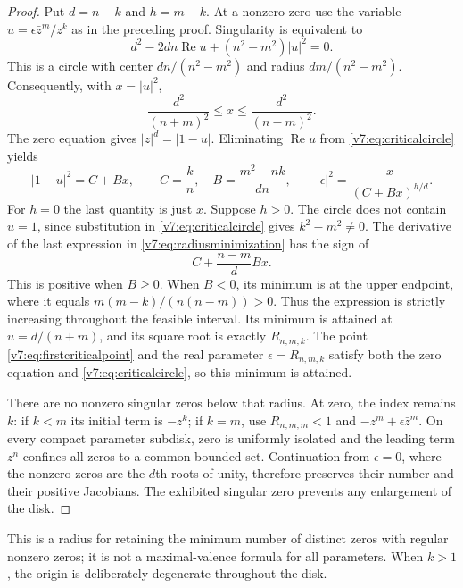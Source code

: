 \documentclass[UTF8,11pt]{ctexart}
\theoremstyle{definition}
\numberwithin{equation}{section}
\DeclareMathOperator{\Rea}{Re}\DeclareMathOperator{\Ima}{Im}
\begin{document}
\begin{proof}
Put $d=n-k$ and $h=m-k$. At a nonzero zero use the variable
$u=\epsilon\bar z^m/z^k$ as in the preceding proof. Singularity
is equivalent to
\begin{equation}\label{v7:eq:criticalcircle}
 d^2-2dn\Rea u+(n^2-m^2)|u|^2=0.
\end{equation}
This is a circle with center $dn/(n^2-m^2)$ and radius
$dm/(n^2-m^2)$. Consequently, with $x=|u|^2$,
\[
 \frac{d^2}{(n+m)^2}\le x\le\frac{d^2}{(n-m)^2}.
\]
The zero equation gives $|z|^d=|1-u|$. Eliminating $\Rea u$
from \eqref{v7:eq:criticalcircle} yields
\begin{equation}\label{v7:eq:radiusminimization}
 |1-u|^2=C+Bx,\qquad
 C=\frac{k}{n},\quad B=\frac{m^2-nk}{dn},\qquad
 |\epsilon|^2=\frac{x}{(C+Bx)^{h/d}}.
\end{equation}
For $h=0$ the last quantity is just $x$. Suppose $h>0$.
The circle does not contain $u=1$, since substitution in
\eqref{v7:eq:criticalcircle} gives $k^2-m^2\ne0$.
The derivative of the last expression in
\eqref{v7:eq:radiusminimization} has the sign of
\[
 C+\frac{n-m}{d}Bx.
\]
This is positive when $B\ge0$. When $B<0$, its minimum is at
the upper endpoint, where it equals
$m(m-k)/(n(n-m))>0$. Thus the expression is strictly increasing
throughout the feasible interval. Its minimum is attained at
$u=d/(n+m)$, and its square root is exactly $R_{n,m,k}$.
The point \eqref{v7:eq:firstcriticalpoint} and the real parameter
$\epsilon=R_{n,m,k}$ satisfy both the zero equation and
\eqref{v7:eq:criticalcircle}, so this minimum is attained.

There are no nonzero singular zeros below that radius. At zero,
the index remains $k$: if $k<m$ its initial term is $-z^k$;
if $k=m$, use $R_{n,m,m}<1$ and
$-z^m+\epsilon\bar z^m$. On every compact parameter subdisk,
zero is uniformly isolated and the leading term $z^n$ confines
all zeros to a common bounded set. Continuation from $\epsilon=0$,
where the nonzero zeros are the $d$th roots of unity, therefore
preserves their number and their positive Jacobians.
The exhibited singular zero prevents any enlargement of the disk.
\end{proof}

This is a radius for retaining the minimum number of distinct
zeros with regular nonzero zeros; it is not a maximal-valence
formula for all parameters. When $k>1$, the origin is deliberately
degenerate throughout the disk.
\end{document}
